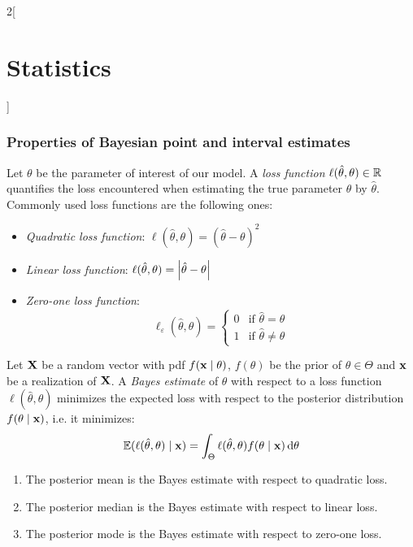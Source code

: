 \documentclass[../../../main.tex]{subfiles}
\begin{document}
\begin{multicols}{2}[\section{Statistics}]
  \subsubsection{Properties of Bayesian point and interval estimates}
  \begin{definition}
    Let $\theta$ be the parameter of interest of our model. A \emph{loss function} $\ell(\hat\theta,\theta)\in\mathbb{R}$ quantifies the loss encountered when estimating the true parameter $\theta$ by $\hat\theta$. Commonly used loss functions are the following ones:
    \begin{itemize}
      \item \emph{Quadratic loss function}: $\ell(\hat\theta,\theta)={(\hat\theta-\theta)}^2$
      \item \emph{Linear loss function}: $\ell(\hat\theta,\theta)=\abs{\hat\theta-\theta}$
      \item \emph{Zero-one loss function}: $$\ell_\varepsilon(\hat\theta,\theta)=
              \begin{cases}
                0 & \text{if }\hat\theta=\theta   \\
                1 & \text{if }\hat\theta\ne\theta
              \end{cases}$$
    \end{itemize}
  \end{definition}
  \begin{definition}
    Let $\boldsymbol{\mathrm{X}}$ be a random vector with pdf $f(\boldsymbol{\mathrm{x}}\mid \theta)$, $f(\theta)$ be the prior of $\theta\in\Theta$ and $\boldsymbol{\mathrm{x}}$ be a realization of $\boldsymbol{\mathrm{X}}$. A \emph{Bayes estimate} of $\theta$ with respect to a loss function $\ell(\hat\theta,\theta)$ minimizes the expected loss with respect to the posterior distribution $f(\theta\mid\boldsymbol{\mathrm{x}})$, i.e. it minimizes: $$\mathbb{E}(\ell(\hat\theta,\theta)\mid\boldsymbol{\mathrm{x}})=\int_\Theta\ell(\hat\theta,\theta)f(\theta\mid\boldsymbol{\mathrm{x}})\dd{\theta}$$
  \end{definition}
  \begin{proposition}
    \hfill
    \begin{enumerate}
      \item The posterior mean is the Bayes estimate with respect to quadratic loss.
      \item The posterior median is the Bayes estimate with respect to linear loss.
      \item The posterior mode is the Bayes estimate with respect to zero-one loss.
    \end{enumerate}
  \end{proposition}

\end{multicols}
\end{document}

